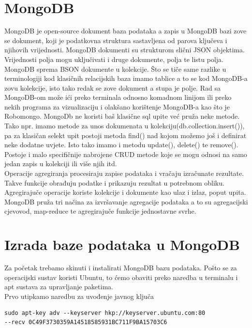 \documentclass[a4paper,12pt]{foi}
\begin{document}
\chapter{MongoDB}
MongoDB je open-source dokument baza podataka a zapis u MongoDB bazi zove se dokument, koji je podatkovna struktura sastavljena od parova ključeva i njihovih vrijednosti. MongoDB dokumenti su strukturom slični JSON objektima. Vrijednosti polja mogu uključivati i druge dokumente, polja te listu polja.\\
MongoDB sprema BSON dokumente u kolekcije. Što se tiče same razlike u terminologiji kod klasičnih relacijskih baza imamo tablice a to se kod MongoDB-a zovu kolekcije, isto tako redak se zove dokument a stupa je polje.
Rad sa MongoDB-om može ići preko terminala odnosno komadnom linijom ili preko nekih programa za vizualizaciju i olakšano korištenje MongoDB-a kao što je Robomongo. MongoDb ne koristi baš klasične sql upite već pruža neke metode. Tako npr. imamo metode za unos dokumenata u kolekciju(db.collection.insert()), pa za klasičan selekt upit postoji metoda find() nad kojom možemo još i definirat neke dodatne uvjete. Isto tako imamo i metodu update(), delete() te remove(). Postoje i malo specifičnije nabrojene CRUD metode koje se mogu odnosi na samo jedan zapis u kolekciji ili više njih itd.\\
Operacije agregiranja procesiraju zapise podataka i vračaju izračunate rezultate. Takve funkcije obrađuju podatke i prikazuju rezultat u potrebnom obliku. Agregirajuče operacije koriste kolekcije i dokumente kao ulaz i izlaz, poput upita. MongoDB pruža tri načina za izvršavanje agregacije podataka a to su agregacijski cjevovod, map-reduce te agregirajuče funkcije jednostavne svrhe. \citep{MongoDB}

\chapter{Izrada baze podataka u MongoDB}
Za početak trebamo skinuti i instalirati MongoDB bazu podataka. Pošto se za operacijski sustav koristi Ubuntu, to ćemo obaviti preko naredba u terminalu i apt sustava za upravljanje paketima.\\
Prvo utipkamo naredbu za uvođenje javnog ključa


\lstset{commentstyle=\textit,language=python}
\begin{lstlisting}[frame=tb]
sudo apt-key adv --keyserver hkp://keyserver.ubuntu.com:80
--recv 0C49F3730359A14518585931BC711F9BA15703C6
\end{lstlisting}
\end{document}
